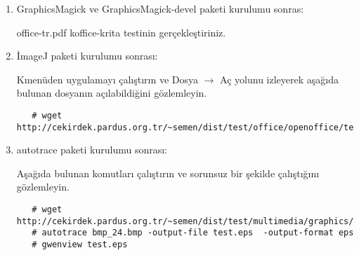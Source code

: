 \documentclass[a4paper,10pt]{article}
\begin{document}
\begin{enumerate}
Yerel dili değiştirmek için:
\begin{verbatim}
export LC_ALL= <lang_LANG>
\end{verbatim}

lang\_LANG şeklinde yazılmış olan, pt-BT için pt\_BT, diğer diller için örneğin de\_DE olacaktır.

Daha sonra bu çalıştırdığınız komut dizininde gimp komutunu çalıştırın, uygulamanın sorunsuz bir şekilde istenilen dilde açıldığını gözlemleyin.
\begin{verbatim}
gimp-i18n-es
gimp-i18n-sk
gimp-i18n-sl
gimp-i18n-sr
gimp-i18n-sr_Latn
gimp-i18n-sv
gimp-i18n-ta
gimp-i18n-th
gimp-i18n-tt
gimp-i18n-uk
gimp-i18n-vi
gimp-i18n-et
gimp-i18n-eu
gimp-i18n-fa
gimp-i18n-fi
gimp-i18n-fr
gimp-i18n-ga
gimp-i18n-gl
gimp-i18n-gu
gimp-i18n-he
gimp-i18n-hi
gimp-i18n-xh
gimp-i18n-yi
gimp-i18n-zh_CN
gimp-i18n-zh_HK
gimp-i18n-zh_TW
gimp-i18n-hr
gimp-i18n-hu
gimp-i18n-id
gimp-i18n-is
gimp-i18n-it
gimp-i18n-ja
gimp-i18n-ka
gimp-i18n-km
gimp-i18n-kn
gimp-i18n-ko
gimp-i18n-lt
gimp-i18n-lv
gimp-i18n-mk
gimp-i18n-ml
gimp-i18n-mr
gimp-i18n-ms
gimp-i18n-nb
gimp-i18n-ne
gimp-i18n-nl
gimp-i18n-nn
gimp-i18n-oc
gimp-i18n-or
gimp-i18n-pa
gimp-i18n-pl
gimp-i18n-pt
gimp-i18n-pt_BR
gimp-i18n-ro
gimp-i18n-ru
gimp-i18n-rw
gimp-i18n-si 
\end{verbatim}


 \item GraphicsMagick ve GraphicsMagick-devel paketi kurulumu sonras:

office-tr.pdf koffice-krita testinin gerçekleştiriniz.

 \item İmageJ paketi kurulumu sonrası:

 Kmenüden uygulamayı çalıştırın ve Dosya $\rightarrow$ Aç yolunu izleyerek aşağıda bulunan dosyanın açılabildiğini gözlemleyin.
  \begin{verbatim}
   # wget http://cekirdek.pardus.org.tr/~semen/dist/test/office/openoffice/test_oodraw.jpg
  \end{verbatim}

\item autotrace paketi kurulumu sonrası:

Aşağıda bulunan komutları çalıştırın ve sorunsuz bir şekilde çalıştığını gözlemleyin.
  \begin{verbatim}
   # wget http://cekirdek.pardus.org.tr/~semen/dist/test/multimedia/graphics/bmp_24.bmp
   # autotrace bmp_24.bmp -output-file test.eps  -output-format eps
   # gwenview test.eps 
  \end{verbatim}


\end{enumerate}
\end{document}
